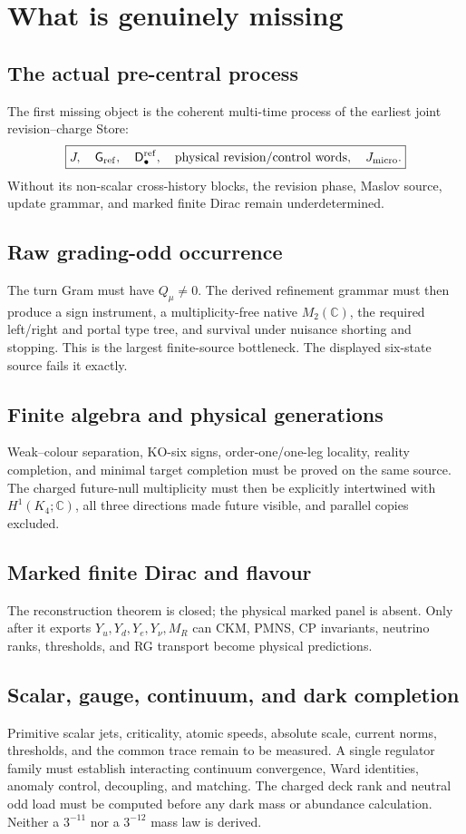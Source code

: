 \documentclass[11pt,oneside,openany]{book}
\numberwithin{equation}{chapter}
\theoremstyle{definition}
\theoremstyle{remark}
\newcommand{\C}{\mathbb C}
\begin{document}
\chapter{What is genuinely missing}
\label{ch:open-boundary}

\section{The actual pre-central process}
The first missing object is the coherent multi-time process of the earliest
joint revision--charge Store:
\[
 \boxed{J,\quad \mathsf G_{\rm ref},\quad
 \mathsf D_\bullet^{\rm ref},\quad
 \text{physical revision/control words},\quad J_{\rm micro}.}
\]
Without its non-scalar cross-history blocks, the revision phase, Maslov source,
update grammar, and marked finite Dirac remain underdetermined.

\section{Raw grading-odd occurrence}
The turn Gram must have \(Q_\mu\ne0\).  The derived refinement grammar must then
produce a sign instrument, a multiplicity-free native \(M_2(\C)\), the required
left/right and portal type tree, and survival under nuisance shorting and
stopping.  This is the largest finite-source bottleneck.  The displayed
six-state source fails it exactly.

\section{Finite algebra and physical generations}
Weak--colour separation, KO-six signs, order-one/one-leg locality, reality
completion, and minimal target completion must be proved on the same source.
The charged future-null multiplicity must then be explicitly intertwined with
\(H^1(K_4;\C)\), all three directions made future visible, and parallel copies
excluded.

\section{Marked finite Dirac and flavour}
The reconstruction theorem is closed; the physical marked panel is absent.
Only after it exports \(Y_u,Y_d,Y_e,Y_\nu,M_R\) can CKM, PMNS, CP invariants,
neutrino ranks, thresholds, and RG transport become physical predictions.

\section{Scalar, gauge, continuum, and dark completion}
Primitive scalar jets, criticality, atomic speeds, absolute scale, current
norms, thresholds, and the common trace remain to be measured.  A single
regulator family must establish interacting continuum convergence, Ward
identities, anomaly control, decoupling, and matching.  The charged deck rank
and neutral odd load must be computed before any dark mass or abundance
calculation.  Neither a \(3^{-11}\) nor a \(3^{-12}\) mass law is derived.
\end{document}
